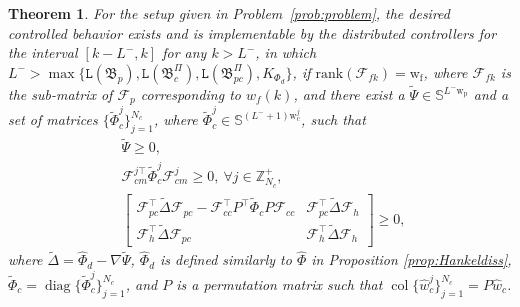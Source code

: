 \documentclass[11pt,print,draftcls,onecolumn,romanappendices]{ieeecolor}
\newtheorem{thm}{Theorem}
\DeclareMathOperator{\col}{col}
\DeclareMathOperator{\diag}{diag}
\newcommand{\Zp}[1]{\mathbb{Z}^+_{#1}}
\newcommand{\lag}[1]{\mathtt{L}\left(#1\right)}
\newcommand{\revise}[1]{{\color{black} #1}}
\newcommand{\B}{\mathfrak{B}}
\newcommand{\F}{\mathcal{F}}
\begin{document}
{%
\begin{thm}\label{thm:controlledexist}
	For the setup given in Problem~\ref{prob:problem}, the desired controlled behavior exists and is implementable by the distributed controllers for the interval \revise{$[k-L^-,k]$} for any $k>L^-$, in which $L^->\max\{\lag{\B_p},\lag{\B_c^\Pi},\lag{\B_{pc}^\Pi},K_{\Phi_d}\}$, if $\mathrm{rank}\left(\F _{fk}\right)=\mathrm{w_{f}}$, where $\F_{fk}$ is the sub-matrix of $\F_p$ corresponding to $w_f(k)$, and there exist a $\widetilde{\Psi}\in\mathbb{S}^{L^-\mathrm{w_p}}$ and a set of matrices $\{\widetilde{\Phi}_c^j\}_{j=1}^{N_c}$, where $\widetilde{\Phi}_c^j\in\mathbb{S}^{(L^-+1)\mathrm{w}_\mathrm{c}^j}$, such that
	\begin{subequations}\label{eq:controlledexist}
	    \begin{align}
	        &\widetilde{\Psi}\geq0,\\
	        &\F_{cm}^{j\top}\widetilde{\Phi}_c^j\F_{cm}^{j}\geq0, \ \forall j\in\Zp{N_c},\label{eq:DOF}\\
	        &\begin{bmatrix}
	            \F_{pc}^\top\widetilde{\Delta}\F_{pc}-\F_{cc}^\top P^\top\widetilde{\Phi}_cP\F_{cc} &\F_{pc}^\top\widetilde{\Delta}\F_h\\
	            \F_h^\top\widetilde{\Delta}\F_{pc}& \F_h^\top\widetilde{\Delta}\F_h
	        \end{bmatrix}\geq0,\label{eq:minimum}\
	    \end{align}
	\end{subequations}
	where $\widetilde{\Delta}=\widehat{\Phi}_d-\nabla\widetilde{\Psi}$, $\widehat{\Phi}_d$ is defined similarly to $\widehat{\Phi}$ in Proposition \ref{prop:Hankeldiss}, $\widetilde{\Phi}_c=\diag\{\widetilde{\Phi}_c^j\}_{j=1}^{N_c}$, and $P$ is a permutation matrix such that $\col\{\hat{w}_c^j\}_{j=1}^{N_c}=P\hat{w}_c$.
	
	
	

\end{thm}}
\end{document}
